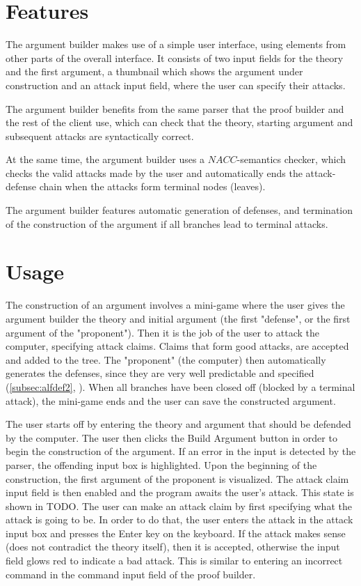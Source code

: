 \documentclass[11pt,twoside,a4paper]{report}
\begin{document}
\section{Features}
The argument builder makes use of a simple user interface, using elements from other parts of the overall interface. It consists of two input fields for the theory and the first argument, a thumbnail which shows the argument under construction and an attack input field, where the user can specify their attacks.

The argument builder benefits from the same parser that the proof builder and the rest of the client use, which can check that the theory, starting argument and subsequent attacks are syntactically correct.

At the same time, the argument builder uses a $NACC$-semantics checker, which checks the valid attacks made by the user and automatically ends the attack-defense chain when the attacks form terminal nodes (leaves).

The argument builder features automatic generation of defenses, and termination of the construction of the argument if all branches lead to terminal attacks.

\section{Usage}
The construction of an argument involves a mini-game where the user gives the argument builder the theory and initial argument (the first "defense", or the first argument of the "proponent"). Then it is the job of the user to attack the computer, specifying attack claims. Claims that form good attacks, are accepted and added to the tree. The "proponent" (the computer) then automatically generates the defenses, since they are very well predictable and specified (\autoref{subsec:alfdef2}, ). When all branches have been closed off (blocked by a terminal attack), the mini-game ends and the user can save the constructed argument.

The user starts off by entering the theory and argument that should be defended by the computer. The user then clicks the Build Argument button in order to begin the construction of the argument. If an error in the input is detected by the parser, the offending input box is highlighted. Upon the beginning of the construction, the first argument of the proponent is visualized. The attack claim input field is then enabled and the program awaits the user's attack. This state is shown in TODO. The user can make an attack claim by first specifying what the attack is going to be. In order to do that, the user enters the attack in the attack input box and presses the Enter key on the keyboard. If the attack makes sense (does not contradict the theory itself), then it is accepted, otherwise the input field glows red to indicate a bad attack. This is similar to entering an incorrect command in the command input field of the proof builder.
\end{document}
